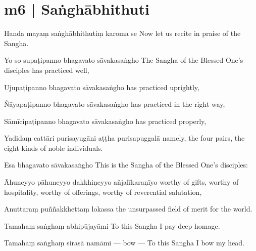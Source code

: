 \section*{m6 | Saṅghābhithuti}

\begin{chantsubsection}
  \chantline
    {Handa mayaṃ saṅghābhithutiṃ karoma se}
    {Now let us recite in praise of the Sangha.}

  \chantline
    {Yo so supaṭipanno bhagavato sāvakasaṅgho}
    {The Sangha of the Blessed One’s disciples has practiced well,}

  \chantline
    {Ujupaṭipanno bhagavato sāvakasaṅgho}
    {has practiced uprightly,}

  \chantline
    {Ñāyapaṭipanno bhagavato sāvakasaṅgho}
    {has practiced in the right way,}

  \chantline
    {Sāmīcipaṭipanno bhagavato sāvakasaṅgho}
    {has practiced properly,}

  \chantline
    {Yadidaṃ cattāri purisayugāni aṭṭha purisapuggalā}
    {namely, the four pairs, the eight kinds of noble individuals.}

  \chantline
    {Esa bhagavato sāvakasaṅgho}
    {This is the Sangha of the Blessed One’s disciples:}

  \chantline
    {Āhuneyyo pāhuneyyo dakkhiṇeyyo añjalīkaraṇīyo}
    {worthy of gifts, worthy of hospitality, worthy of offerings, worthy of reverential salutation,}

  \chantline
    {Anuttaraṃ puññakkhettaṃ lokassa}
    {the unsurpassed field of merit for the world.}

  \chantline
    {Tamahaṃ saṅghaṃ abhipūjayāmi}
    {To this Sangha I pay deep homage.}

  \chantline
    {Tamahaṃ saṅghaṃ sirasā namāmi \;\;\; --- bow ---}
    {To this Sangha I bow my head.}

\end{chantsubsection}